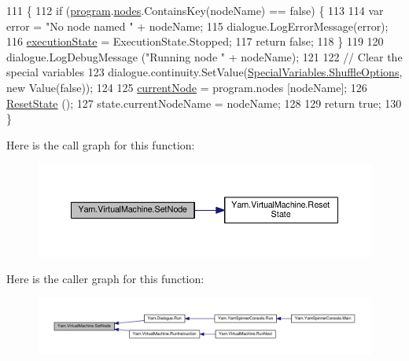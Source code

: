 \begin{DoxyCode}
111                                              \{
112             \textcolor{keywordflow}{if} (\hyperlink{a00156_a2695dbfe3d9df7ffa3f13ad2231217fb}{program}.\hyperlink{a00146_a3f4928a577c88263ad016be259b175c4}{nodes}.ContainsKey(nodeName) == \textcolor{keyword}{false}) \{
113 
114                 var error = \textcolor{stringliteral}{"No node named "} + nodeName;
115                 dialogue.LogErrorMessage(error);
116                 \hyperlink{a00156_a66491da06023dabfb63d09e6ccbba74f}{executionState} = ExecutionState.Stopped;
117                 \textcolor{keywordflow}{return} \textcolor{keyword}{false};
118             \}
119 
120             dialogue.LogDebugMessage (\textcolor{stringliteral}{"Running node "} + nodeName);
121 
122             \textcolor{comment}{// Clear the special variables}
123             dialogue.continuity.SetValue(\hyperlink{a00156_aecbb8ab9becd96457d836100b2818078}{SpecialVariables.ShuffleOptions}, \textcolor{keyword}{
      new} Value(\textcolor{keyword}{false}));
124 
125             \hyperlink{a00156_ab7594e14981ad75cecea3b2e7dcf895c}{currentNode} = program.nodes [nodeName];
126             \hyperlink{a00156_a3ba945c66cb8ba031357a1771453f82b}{ResetState} ();
127             state.currentNodeName = nodeName;
128 
129             \textcolor{keywordflow}{return} \textcolor{keyword}{true};
130         \}
\end{DoxyCode}


Here is the call graph for this function\-:
\nopagebreak
\begin{figure}[H]
\begin{center}
\leavevmode
\includegraphics[width=350pt]{a00156_a6364593ea1115d65e34b343422cfbbbd_cgraph}
\end{center}
\end{figure}




Here is the caller graph for this function\-:
\nopagebreak
\begin{figure}[H]
\begin{center}
\leavevmode
\includegraphics[width=350pt]{a00156_a6364593ea1115d65e34b343422cfbbbd_icgraph}
\end{center}
\end{figure}


